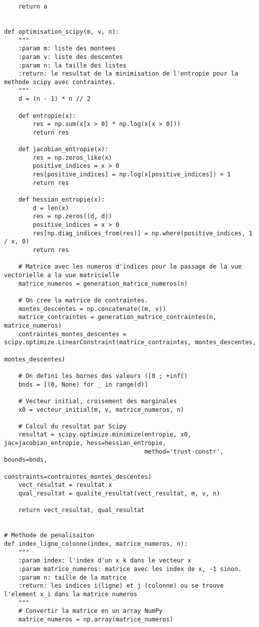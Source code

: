 \documentclass[12pt]{article}
\begin{document}
\begin{lstlisting}
    return a


def optimisation_scipy(m, v, n):
    """
    :param m: liste des montees
    :param v: liste des descentes
    :param n: la taille des listes
    :return: le resultat de la minimisation de l'entropie pour la methode scipy avec contraintes.
    """
    d = (n - 1) * n // 2

    def entropie(x):
        res = np.sum(x[x > 0] * np.log(x[x > 0]))
        return res

    def jacobian_entropie(x):
        res = np.zeros_like(x)
        positive_indices = x > 0
        res[positive_indices] = np.log(x[positive_indices]) + 1
        return res

    def hessian_entropie(x):
        d = len(x)
        res = np.zeros((d, d))
        positive_indices = x > 0
        res[np.diag_indices_from(res)] = np.where(positive_indices, 1 / x, 0)
        return res

    # Matrice avec les numeros d'indices pour le passage de la vue vectorielle a la vue matricielle
    matrice_numeros = generation_matrice_numeros(n)

    # On cree la matrice de contraintes.
    montes_descentes = np.concatenate((m, v))
    matrice_contraintes = generation_matrice_contraintes(n, matrice_numeros)
    contraintes_montes_descentes = scipy.optimize.LinearConstraint(matrice_contraintes, montes_descentes,
                                                                   montes_descentes)

    # On defini les bornes des valeurs ([0 ; +inf[)
    bnds = [(0, None) for _ in range(d)]

    # Vecteur initial, croisement des marginales
    x0 = vecteur_initial(m, v, matrice_numeros, n)

    # Calcul du resultat par Scipy
    resultat = scipy.optimize.minimize(entropie, x0, jac=jacobian_entropie, hess=hessian_entropie,
                                       method='trust-constr', bounds=bnds,
                                       constraints=contraintes_montes_descentes)
    vect_resultat = resultat.x
    qual_resultat = qualite_resultat(vect_resultat, m, v, n)

    return vect_resultat, qual_resultat


# Methode de penalisaiton
def index_ligne_colonne(index, matrice_numeros, n):
    """
    :param index: l'index d'un x_k dans le vecteur x
    :param matrice_numeros: matrice avec les index de x, -1 sinon.
    :param n: taille de la matrice
    :return: les indices i(ligne) et j (colonne) ou se trouve l'element x_i dans la matrice numeros
    """
    # Convertir la matrice en un array NumPy
    matrice_numeros = np.array(matrice_numeros)


\end{lstlisting}
\end{document}

